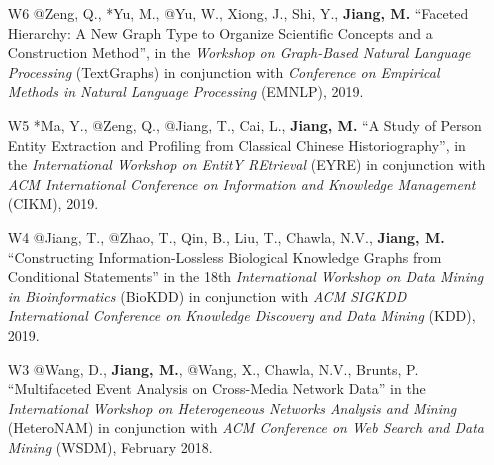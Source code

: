 \documentclass[10pt]{article}
\newenvironment{myindentpar}[1]%
{\begin{list}{}%
         {\setlength{\leftmargin}{#1}}%
         \item[]%
}
{\end{list}}
\newcounter{list}
\begin{document}
\begin{myindentpar}{0.00cm}
\begin{enumerate}[leftmargin=.5cm]
\vspace{-0.1cm}
	
\item[W6] @Zeng, Q., *Yu, M., @Yu, W., Xiong, J., Shi, Y., \textbf{Jiang, M.} ``Faceted Hierarchy: A New Graph Type to Organize Scientific Concepts and a Construction Method'', in the \textit{Workshop on Graph-Based Natural Language Processing} (TextGraphs) in conjunction with \textit{Conference on Empirical Methods in Natural Language Processing} (EMNLP), 2019.

\vspace{-0.1cm}
	
\item[W5] *Ma, Y., @Zeng, Q., @Jiang, T., Cai, L., \textbf{Jiang, M.} ``A Study of Person Entity Extraction and Profiling from Classical Chinese Historiography'', in the \textit{International Workshop on EntitY REtrieval} (EYRE) in conjunction with \textit{ACM International Conference on Information and Knowledge Management} (CIKM), 2019.

\vspace{-0.1cm}

\item[W4] @Jiang, T., @Zhao, T., Qin, B., Liu, T., Chawla, N.V., \textbf{Jiang, M.} ``Constructing Information-Lossless Biological Knowledge Graphs from Conditional Statements'' in the 18th \textit{International Workshop on Data Mining in Bioinformatics} (BioKDD) in conjunction with \textit{ACM SIGKDD International Conference on Knowledge Discovery and Data Mining} (KDD), 2019.

\vspace{-0.1cm}
	
\item[W3] @Wang, D., \textbf{Jiang, M.}, @Wang, X., Chawla, N.V., Brunts, P. ``Multifaceted Event Analysis on Cross-Media Network Data'' in the \textit{International Workshop on Heterogeneous Networks Analysis and Mining} (HeteroNAM) in conjunction with \textit{ACM Conference on Web Search and Data Mining} (WSDM), February 2018.


\end{enumerate}
\end{myindentpar}
\end{document}

